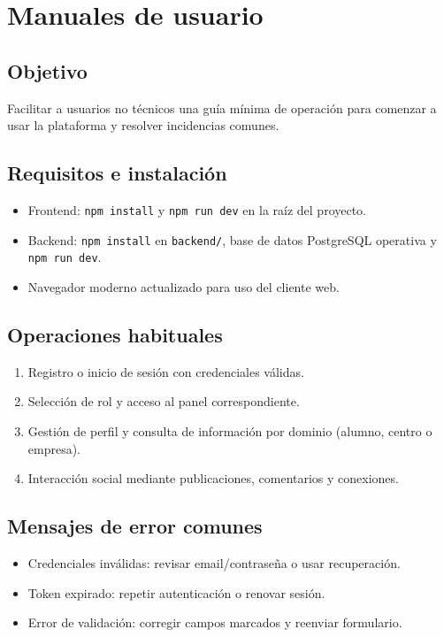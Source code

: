 \documentclass[12pt, a4paper]{report}
\begin{document}
\chapter{Manuales de usuario}

\section{Objetivo}

Facilitar a usuarios no técnicos una guía mínima de operación para comenzar a usar la plataforma y
resolver incidencias comunes.

\section{Requisitos e instalación}

\begin{itemize}
  \item Frontend: \texttt{npm install} y \texttt{npm run dev} en la raíz del proyecto.
  \item Backend: \texttt{npm install} en \texttt{backend/}, base de datos PostgreSQL operativa y
        \texttt{npm run dev}.
  \item Navegador moderno actualizado para uso del cliente web.
\end{itemize}

\section{Operaciones habituales}

\begin{enumerate}
  \item Registro o inicio de sesión con credenciales válidas.
  \item Selección de rol y acceso al panel correspondiente.
  \item Gestión de perfil y consulta de información por dominio (alumno, centro o empresa).
  \item Interacción social mediante publicaciones, comentarios y conexiones.
\end{enumerate}

\section{Mensajes de error comunes}

\begin{itemize}
  \item Credenciales inválidas: revisar email/contraseña o usar recuperación.
  \item Token expirado: repetir autenticación o renovar sesión.
  \item Error de validación: corregir campos marcados y reenviar formulario.
\end{itemize}
\end{document}
